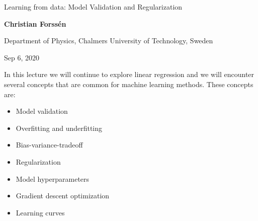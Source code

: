 \documentclass[%
oneside,                 %
final,                   %
10pt]{article}
\begin{document}

\newcommand{\exercisesection}[1]{\subsection*{#1}}







\thispagestyle{empty}

\begin{center}
{\LARGE\bf
\begin{spacing}{1.25}
Learning from data: Model Validation and Regularization
\end{spacing}
}
\end{center}


\begin{center}
{\bf Christian Forssén}
\end{center}

    \begin{center}
\centerline{{\small Department of Physics, Chalmers University of Technology, Sweden}}
\end{center}
    

\begin{center}
Sep 6, 2020
\end{center}

\vspace{1cm}


In this lecture we will continue to explore linear regression and we will encounter several concepts that are common for machine learning methods. These concepts are:
\begin{itemize}
  \item Model validation

  \item Overfitting and underfitting

  \item Bias-variance-tradeoff

  \item Regularization

  \item Model hyperparameters

  \item Gradient descent optimization

  \item Learning curves
\end{itemize}
\end{document}
